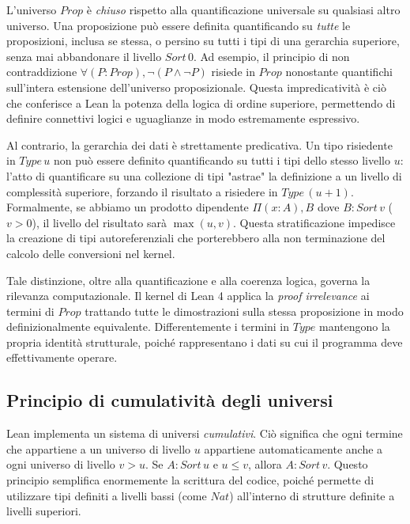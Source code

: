 \begin{description}[leftmargin=1.5em, style=nextline, font=\bfseries]
    \item 
        [Impredicativita (Prop)] 
        L'universo $Prop$ è \emph{chiuso} rispetto alla quantificazione universale su qualsiasi altro universo. 
        Una proposizione può essere definita quantificando su \emph{tutte} le proposizioni, inclusa se stessa, 
        o persino su tutti i tipi di una gerarchia superiore, senza mai abbandonare il livello $Sort \, 0$. Ad 
        esempio, il principio di non contraddizione $\forall (P : Prop), \neg(P \wedge \neg P)$ risiede in $Prop$ 
        nonostante quantifichi sull'intera estensione dell'universo proposizionale. Questa impredicatività è ciò 
        che conferisce a Lean la potenza della logica di ordine superiore, permettendo di definire connettivi logici
        e uguaglianze in modo estremamente espressivo.
    \item 
        [Predicativita (Type u)] 
        Al contrario, la gerarchia dei dati è strettamente predicativa. Un tipo risiedente in $Type \, u$ non può 
        essere definito quantificando su tutti i tipi dello stesso livello $u$: l'atto di quantificare su una collezione 
        di tipi "astrae" la definizione a un livello di complessità superiore, forzando il risultato a risiedere in 
        $Type\,(u+1)$. Formalmente, se abbiamo un prodotto dipendente $\Pi (x : A), B$ dove $B : Sort \, v$ ($v > 0$), 
        il livello del risultato sarà $\max(u, v)$. Questa stratificazione impedisce la creazione di tipi autoreferenziali 
        che porterebbero alla non terminazione del calcolo delle conversioni nel kernel.
\end{description}
Tale distinzione, oltre alla quantificazione e alla coerenza logica, governa la rilevanza computazionale. Il kernel di Lean 4
applica la \emph{proof irrelevance} ai termini di $Prop$ trattando tutte le dimostrazioni sulla stessa proposizione in modo 
definizionalmente equivalente. Differentemente i termini in $Type$ mantengono la propria identità strutturale, poiché rappresentano 
i dati su cui il programma deve effettivamente operare.

\subsection{Principio di cumulatività degli universi}
Lean implementa un sistema di universi \emph{cumulativi}. Ciò significa che ogni termine che appartiene a un universo di livello $u$ 
appartiene automaticamente anche a ogni universo di livello $v > u$. Se $A : Sort \, u$ e $u \le v$, allora $A : Sort \, v$. Questo 
principio semplifica enormemente la scrittura del codice, poiché permette di utilizzare tipi definiti a livelli bassi (come $Nat$) 
all'interno di strutture definite a livelli superiori.

